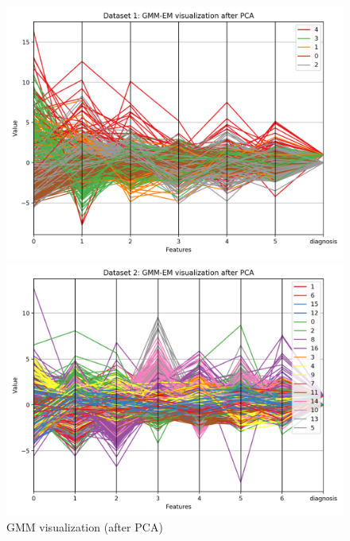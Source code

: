 \documentclass[letterpaper]{article}
\begin{document}
	\begin{figure}
		\centering
		\begin{minipage}{.5\textwidth}
			\centering
			\includegraphics[width=\linewidth]{../../plots/pca_gmm_comp_viz_1}
		\end{minipage}%
		\begin{minipage}{.5\textwidth}
			\centering
			\includegraphics[width=\linewidth]{../../plots/pca_gmm_comp_viz_2}
		\end{minipage}
		\caption{GMM visualization (after PCA)}
		\label{fig:pca_gmm_viz}
	\end{figure}
\end{document}
